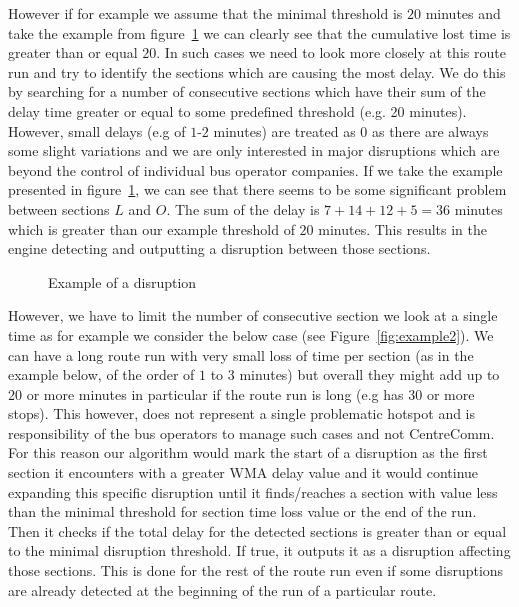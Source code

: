 However if for example we assume that the minimal threshold is $20$ minutes and take the example from figure~\ref{fig:example3} we can clearly see that the cumulative lost time is greater than or equal $20$. In such cases we need to look more closely at this route run and try to identify the sections which are causing the most delay. We do this by searching for a number of consecutive sections which have their sum of the delay time greater or equal to some predefined threshold (e.g. 20 minutes). However, small delays (e.g of $1$-$2$ minutes) are treated as $0$ as there are always some slight variations and we are only interested in major disruptions which are beyond the control of individual bus operator companies. If we take the example presented in figure~\ref{fig:example3}, we can see that there seems to be some significant problem between sections $L$ and $O$. The sum of the delay is $7+14+12+5 = 36$ minutes which is greater than our example threshold of $20$ minutes. This results in the engine detecting and outputting a disruption between those sections.

\begin{figure}[ht]
	\caption{Example of a disruption}
	\label{fig:example3}
\end{figure}

However, we have to limit the number of consecutive section we look at a single time as for example we consider the below case (see Figure~\ref{fig:example2}). We can have a long route run with very small loss of time per section (as in the example below, of the order of $1$ to $3$ minutes) but overall they might add up to $20$ or more minutes in particular if the route run is long (e.g has 30 or more stops). This however, does not represent a single problematic hotspot and is responsibility of the bus operators to manage such cases and not CentreComm. For this reason our algorithm would mark the start of a disruption as the first section it encounters with a greater WMA delay value and it would continue expanding this specific disruption until it finds/reaches a section with value less than the minimal threshold for section time loss value or the end of the run. Then it checks if the total delay for the detected sections is greater than or equal to the minimal disruption threshold. If true, it outputs it as a disruption affecting those sections. This is done for the rest of the route run even if some disruptions are already detected at the beginning of the run of a particular route.

